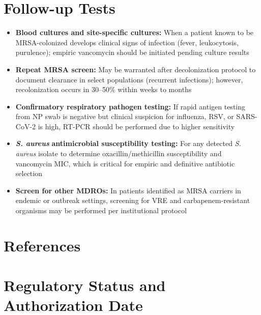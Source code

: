 \section*{Follow-up Tests}
\begin{itemize}
  \item \textbf{Blood cultures and site-specific cultures:} When a patient known to be MRSA-colonized develops clinical signs of infection (fever, leukocytosis, purulence); empiric vancomycin should be initiated pending culture results
  \item \textbf{Repeat MRSA screen:} May be warranted after decolonization protocol to document clearance in select populations (recurrent infections); however, recolonization occurs in 30--50\% within weeks to months
  \item \textbf{Confirmatory respiratory pathogen testing:} If rapid antigen testing from NP swab is negative but clinical suspicion for influenza, RSV, or SARS-CoV-2 is high, RT-PCR should be performed due to higher sensitivity
  \item \textit{\textbf{S. aureus}} \textbf{antimicrobial susceptibility testing:} For any detected \textit{S. aureus} isolate to determine oxacillin/methicillin susceptibility and vancomycin MIC, which is critical for empiric and definitive antibiotic selection
  \item \textbf{Screen for other MDROs:} In patients identified as MRSA carriers in endemic or outbreak settings, screening for VRE and carbapenem-resistant organisms may be performed per institutional protocol
\end{itemize}

\section*{References}



\clearpage
\section*{Regulatory Status and Authorization Date}

\clearpage
